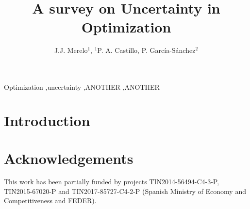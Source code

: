 \documentclass[preprint]{elsarticle}
\begin{document}
\begin{frontmatter}

\title{A survey on Uncertainty in Optimization}


\author{J.J. Merelo$^1$, $^1$P. A. Castillo, P. Garc\'ia-S\'anchez$^2$ } %
\address{
$^1$ Department of Computer Architecture and Computer Technology.\\ ETSIIT - CITIC. University of Granada, Spain\\
$^2$ Department of Computer Science and Engineering. ESI. University of C\'adiz, Spain\\

}


\begin{abstract}



\end{abstract}


\begin{keyword}
Optimization \sep uncertainty  \sep ANOTHER \sep ANOTHER
\end{keyword}

\end{frontmatter}





\section{Introduction}




\section*{Acknowledgements}
This work has been partially funded by projects TIN2014-56494-C4-3-P, TIN2015-67020-P and TIN2017-85727-C4-2-P (Spanish Ministry of Economy and Competitiveness and FEDER). %






\end{document}
